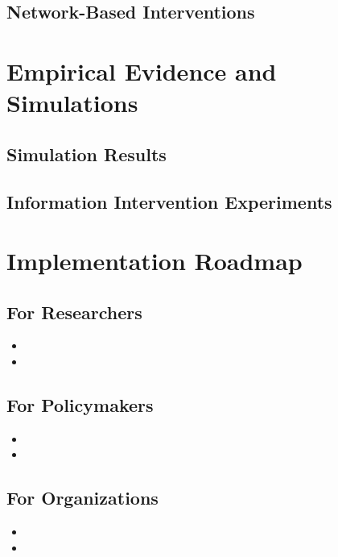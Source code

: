 \documentclass[11pt,letterpaper]{report}
\theoremstyle{definition}
\theoremstyle{remark}
\begin{document}
\section{Network-Based Interventions}
\lipsum[5]

\chapter{Empirical Evidence and Simulations}
\lipsum[1-2]

\section{Simulation Results}
\lipsum[3-4]

\section{Information Intervention Experiments}
\lipsum[5-6]

\chapter{Implementation Roadmap}
\lipsum[1]

\section{For Researchers}
\begin{itemize}
    \item \lipsum[1][1-2]
    \item \lipsum[1][3-4]
\end{itemize}

\section{For Policymakers}
\begin{itemize}
    \item \lipsum[2][1-2]
    \item \lipsum[2][3-4]
\end{itemize}

\section{For Organizations}
\begin{itemize}
    \item \lipsum[3][1-2]
    \item \lipsum[3][3-4]
\end{itemize}
\end{document}
